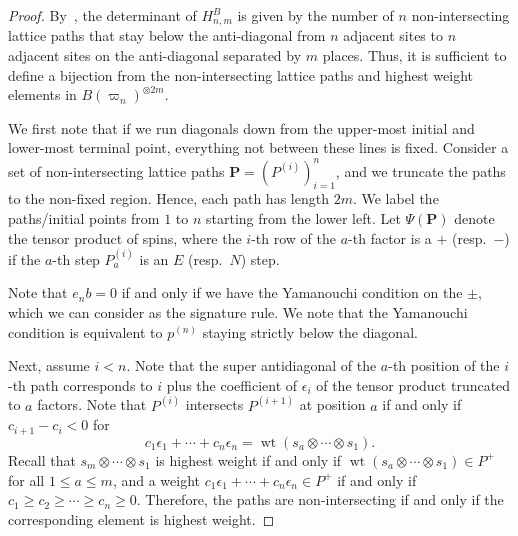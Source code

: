 \documentclass[11pt, leqno]{amsart}
\theoremstyle{plain}
\theoremstyle{definition}
\numberwithin{equation}{section}
\newcommand{\fw}{\varpi} %
\newcommand{\nilp}{\mathbf{P}} %
\newcommand{\wt}{\operatorname{wt}} %
\begin{document}
\begin{proof}
By~\cite[Thm.~1]{MW00}, the determinant of $H^B_{n,m}$ is given by the number of $n$ non-intersecting lattice paths that stay below the anti-diagonal from $n$ adjacent sites to $n$ adjacent sites on the anti-diagonal separated by $m$ places.
Thus, it is sufficient to define a bijection from the non-intersecting lattice paths and highest weight elements in $B(\fw_n)^{\otimes 2m}$.

We first note that if we run diagonals down from the upper-most initial and lower-most terminal point, everything not between these lines is fixed.
Consider a set of non-intersecting lattice paths $\nilp = (P^{(i)})_{i=1}^n$, and we truncate the paths to the non-fixed region. Hence, each path has length $2m$.
We label the paths/initial points from $1$ to $n$ starting from the lower left.
Let $\Psi(\nilp)$ denote the tensor product of spins, where the $i$-th row of the $a$-th factor is a $+$ (resp.~$-$) if the $a$-th step $P^{(i)}_a$ is an $E$ (resp.~$N$) step.

Note that $e_n b = 0$ if and only if we have the Yamanouchi condition on the $\pm$, which we can consider as the signature rule. We note that the Yamanouchi condition is equivalent to $p^{(n)}$ staying strictly below the diagonal.

Next, assume $i < n$. Note that the super antidiagonal of the $a$-th position of the $i$-th path corresponds to $i$ plus the coefficient of $\epsilon_i$ of the tensor product truncated to $a$ factors. Note that $P^{(i)}$ intersects $P^{(i+1)}$ at position $a$ if and only if $c_{i+1} - c_i < 0$ for
\[
c_1 \epsilon_1 + \cdots + c_n \epsilon_n = \wt(s_a \otimes \cdots \otimes s_1).
\]
Recall that $s_m \otimes \cdots \otimes s_1$ is highest weight if and only if $\wt(s_a \otimes \cdots \otimes s_1) \in P^+$ for all $1 \leq a \leq m$, and a weight $c_1 \epsilon_1 + \cdots + c_n \epsilon_n \in P^+$ if and only if $c_1 \geq c_2 \geq \cdots \geq c_n \geq 0$.
Therefore, the paths are non-intersecting if and only if the corresponding element is highest weight.
\end{proof}
\end{document}
